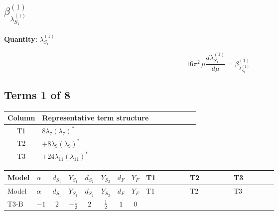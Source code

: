\documentclass[8pt]{article}
\begin{document}
\begin{landscape}
\section*{$\beta_{\lambda_{S_1}^{(1)}}^{(1)}$}
\noindent\textbf{Quantity: }$\lambda_{S_1}^{(1)}$\par\smallskip
\[16\pi^2\,\mu\frac{d \lambda_{S_1}^{(1)}}{d\mu}=\beta_{\lambda_{S_1}^{(1)}}^{(1)}\]
\subsection*{Terms 1 of 8}
\begin{center}
\begin{tabular}{@{}c >{\raggedright\arraybackslash}p{0.82\linewidth}@{}}
\toprule
Column & Representative term structure \\
\midrule
T1 & \(\displaystyle 8 {\lambda_7} \left({\lambda_7}\right)^{*}\) \\
\midrule
T2 & \(\displaystyle +8 {\lambda_9} \left({\lambda_9}\right)^{*}\) \\
\midrule
T3 & \(\displaystyle +24 {\lambda_{11}} \left({\lambda_{11}}\right)^{*}\) \\
\midrule
\bottomrule
\end{tabular}
\end{center}
\smallskip
\tiny
\begin{longtable}{@{}llcccccc >{\raggedright\arraybackslash}p{0.21\linewidth} >{\raggedright\arraybackslash}p{0.21\linewidth} >{\raggedright\arraybackslash}p{0.21\linewidth}@{}}
\toprule
Model & $\alpha$ & $d_{S_1}$ & $Y_{S_1}$ & $d_{S_2}$ & $Y_{S_2}$ & $d_F$ & $Y_F$ & T1 & T2 & T3 \\
\midrule
\endfirsthead
\toprule
Model & $\alpha$ & $d_{S_1}$ & $Y_{S_1}$ & $d_{S_2}$ & $Y_{S_2}$ & $d_F$ & $Y_F$ & T1 & T2 & T3 \\
\midrule
\endhead
T3-B & $-1$ & $2$ & $-\frac{1}{2}$ & $2$ & $\frac{1}{2}$ & $1$ & $0$ & \scriptsize\adjustbox{max width=\linewidth}{$\begin{gathered} 8 {\lambda_7} \left({\lambda_7}\right)^{*}\end{gathered}$} & \scriptsize\adjustbox{max width=\linewidth}{$\begin{gathered} +8 {\lambda_9} \left({\lambda_9}\right)^{*}\end{gathered}$} & \scriptsize\adjustbox{max width=\linewidth}{$\begin{gathered} +24 {\lambda_{11}} \left({\lambda_{11}}\right)^{*}\end{gathered}$} \\

\end{longtable}
\end{landscape}
\end{document}
